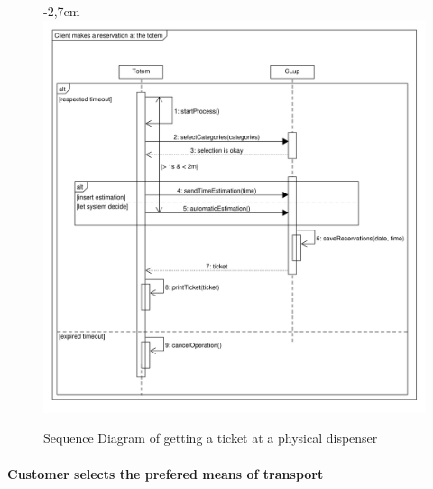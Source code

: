 \documentclass{article}
\begin{document}
\begin{center}
\begin{itemize}
					
				\end{itemize}
								\begin{figure}[!htb]
						\begin{adjustwidth} {-2,7cm}{}
							\centering
							\includegraphics[scale=0.56]{SD/11_getTicketAtTotem.pdf}\\
							\caption{Sequence Diagram of getting a ticket at a physical dispenser}
						\end{adjustwidth}
					\end{figure}
				\end{center}
			\newpage
			\paragraph{Customer selects the prefered means of transport}
			
\end{document}
